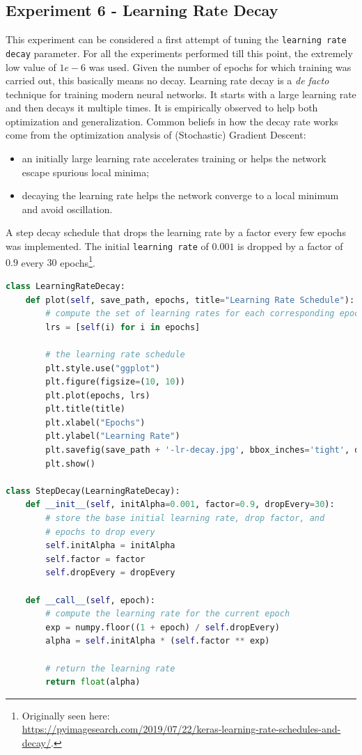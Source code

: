 \documentclass[11pt,a4paper]{article}
\begin{document}
\subsection{Experiment 6 - Learning Rate Decay}
This experiment can be considered a first attempt of tuning the \texttt{learning rate decay} parameter. For all the experiments performed till this point, the extremely low value of $1e-6$ was used. Given the number of epochs for which training was carried out, this basically means no decay. Learning rate decay \cite{you2019does} is a \emph{de facto} technique for training modern neural networks. It starts with a large learning rate and then decays it multiple times. It is empirically observed to help both optimization and generalization. Common beliefs in how the decay rate works come from the optimization analysis of (Stochastic) Gradient Descent:
\begin{itemize}
    \item an initially large learning rate accelerates training or helps the network escape spurious local minima;
    \item decaying the learning rate helps the network converge to a local minimum and avoid oscillation.
\end{itemize}
A step decay schedule that drops the learning rate by a factor every few epochs was implemented. The initial \texttt{learning rate} of $0.001$ is dropped by a factor of $0.9$ every $30$ epochs\footnote{Originally seen here:\\ \url{https://pyimagesearch.com/2019/07/22/keras-learning-rate-schedules-and-decay/}.}.
\begin{lstlisting}[language=Python,frame=single]
class LearningRateDecay:
    def plot(self, save_path, epochs, title="Learning Rate Schedule"):
        # compute the set of learning rates for each corresponding epoch
        lrs = [self(i) for i in epochs]

        # the learning rate schedule
        plt.style.use("ggplot")
        plt.figure(figsize=(10, 10))
        plt.plot(epochs, lrs)
        plt.title(title)
        plt.xlabel("Epochs")
        plt.ylabel("Learning Rate")
        plt.savefig(save_path + '-lr-decay.jpg', bbox_inches='tight', dpi=200)
        plt.show()

class StepDecay(LearningRateDecay):
    def __init__(self, initAlpha=0.001, factor=0.9, dropEvery=30):
        # store the base initial learning rate, drop factor, and
        # epochs to drop every
        self.initAlpha = initAlpha
        self.factor = factor
        self.dropEvery = dropEvery

    def __call__(self, epoch):
        # compute the learning rate for the current epoch
        exp = numpy.floor((1 + epoch) / self.dropEvery)
        alpha = self.initAlpha * (self.factor ** exp)

        # return the learning rate
        return float(alpha)
\end{lstlisting}
\end{document}

